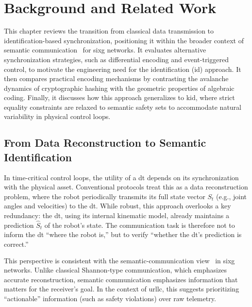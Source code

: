 \chapter{Background and Related Work}
\label{ch:background}

This chapter reviews the transition from classical data transmission to identification-based synchronization, positioning it within the broader context of semantic communication~\cite{zhang2025semantic} for \gls{sixg} networks. It evaluates alternative synchronization strategies, such as differential encoding and event-triggered control, to motivate the engineering need for the identification (\gls{id}) approach. It then compares practical encoding mechanisms by contrasting the avalanche dynamics of cryptographic hashing with the geometric properties of algebraic coding. Finally, it discusses how this approach generalizes to \gls{kid}, where strict equality constraints are relaxed to semantic safety sets to accommodate natural variability in physical control loops.

\section{From Data Reconstruction to Semantic Identification}
\label{sec:semantic_shift}

In time-critical control loops, the utility of a \gls{dt} depends on its synchronization with the physical asset. Conventional protocols treat this as a data reconstruction problem, where the robot periodically transmits its full state vector $S_t$ (e.g., joint angles and velocities) to the \gls{dt}. While robust, this approach overlooks a key redundancy: the \gls{dt}, using its internal kinematic model, already maintains a prediction $\hat{S}_t$ of the robot's state. The communication task is therefore not to inform the \gls{dt} ``where the robot is,'' but to verify ``whether the \gls{dt}'s prediction is correct.''

This perspective is consistent with the semantic-communication view~\cite{strinati2024goal} in \gls{sixg} networks. Unlike classical Shannon-type communication, which emphasizes accurate reconstruction, semantic communication emphasizes information that matters for the receiver's goal. In the context of \gls{urllc}, this suggests prioritizing ``actionable'' information (such as safety violations) over raw telemetry.

